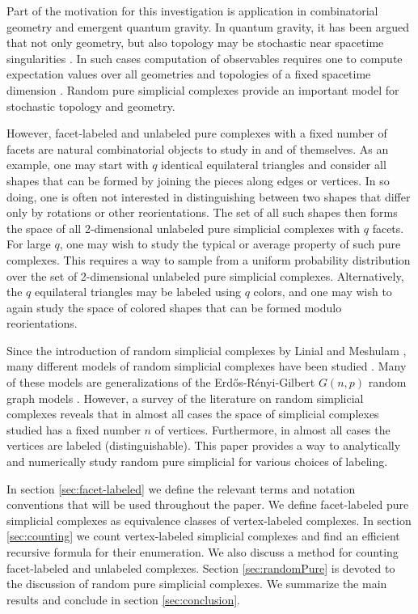\documentclass[12pt]{article}
\theoremstyle{plain}
\theoremstyle{definition}
\theoremstyle{remark}
\begin{document}
Part of the motivation for this investigation is application in  combinatorial geometry and emergent quantum gravity. In quantum gravity, it has been argued that not only geometry, but also topology may be stochastic near spacetime singularities \cite{wheeler1955geons}. In such cases computation of observables requires one to compute expectation values over all geometries and topologies of a fixed spacetime dimension \cite{gibbons1977action}.  Random pure simplicial complexes provide an important model for stochastic topology and geometry. 

However, facet-labeled and unlabeled pure complexes with a fixed number of facets are natural combinatorial objects to study in and of themselves. As an example, one may start with $q$ identical equilateral triangles and consider all shapes that can be formed by joining the pieces along edges or vertices. In so doing, one is often not interested in distinguishing between two shapes that differ only by rotations or other reorientations. The set of all such shapes then forms the space of all 2-dimensional unlabeled pure simplicial complexes with $q$ facets. For large $q$, one may wish to study the typical or average property of such pure complexes. This requires a way to sample from a uniform probability distribution over the set of 2-dimensional unlabeled pure simplicial complexes. Alternatively, the $q$ equilateral triangles may be labeled using $q$ colors, and one may wish to again study the space of colored shapes that can be formed modulo reorientations.

Since the introduction of random simplicial complexes by Linial and Meshulam \cite{linial2006homological, meshulam2009homological}, many different models of random simplicial complexes have been studied \cite{kahle2017random, bobrowski2022random,  markstrom2020random, kahle2014topology,brooke2013infinite}. Many of these models are generalizations of the Erd\H{o}s-R\'{e}nyi-Gilbert $G(n,p)$ random graph models \cite{erdds1959random, gilbert1959random}. However, a survey of the literature on random simplicial complexes reveals that in almost all cases the space of simplicial complexes studied has a fixed number $n$ of vertices. Furthermore, in almost all cases the vertices are labeled (distinguishable). This paper provides a way to analytically and numerically study random pure simplicial for various choices of labeling. 

In section \ref{sec:facet-labeled} we define the relevant terms and notation conventions that will be used throughout the paper. We define facet-labeled pure simplicial complexes as equivalence classes of vertex-labeled complexes. In section \ref{sec:counting} we count vertex-labeled simplicial complexes and find an efficient recursive formula for their enumeration. We also discuss a method for counting facet-labeled and unlabeled complexes. Section \ref{sec:randomPure} is devoted to the discussion of random pure simplicial complexes. We summarize the main results and conclude in section \ref{sec:conclusion}.
\end{document}
